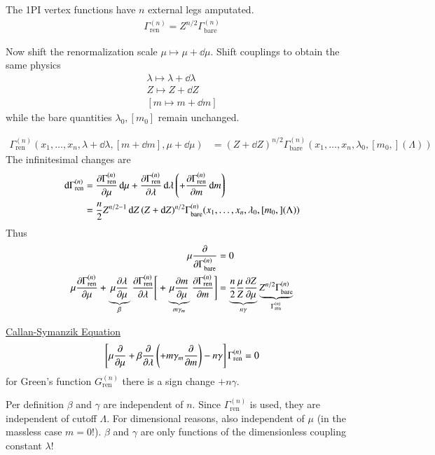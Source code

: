 The 1PI vertex functions have $n$ external legs amputated.
\begin{align}
   \Gamma_\text{ren}^{(n)} = Z^{n/2} \Gamma_\text{bare}^{(n)}
\end{align}

Now shift the renormalization scale $\mu \mapsto \mu + \dd{\mu}$. Shift couplings to obtain the same physics
\begin{align*}
   \lambda \mapsto \lambda + \dd{\lambda} \\
   Z \mapsto Z + \dd{Z} \\
   [m \mapsto m + \dd{m} ] 
\end{align*}
while the bare quantities $\lambda_0, [m_0] $ remain unchanged.

\begin{align}
   \Gamma_\text{ren}^{(n)}(x_1, \dots, x_n, \lambda + \dd{\lambda}, [m + \dd{m}], \mu + \dd{\mu}) &= (Z+ \dd{Z})^{n/2} \Gamma_\text{bare}^{(n)}(x_1,\dots, x_n, \lambda_0, [m_0,] (\Lambda))
\end{align}
The infinitesimal changes are
\begin{align*}
   \dd{\Gamma}_\text{ren}^{(n)} &= \pdv{\Gamma_\text{ren}^{(n)}}{\mu} \dd{\mu} + \pdv{\Gamma^{(n)}_\text{ren}}{\lambda} \dd{\lambda} \left( + \pdv{\Gamma_\text{ren}^{(n)}}{m} \dd{m} \right) \\
                                &= \frac{n}{2} Z^{n/2-1} \dd{Z} (Z+ \dd{Z})^{n/2} \Gamma_\text{bare}^{(n)}(x_1,\dots, x_n, \lambda_0, [m_0,] (\Lambda))
\end{align*}
Thus
\begin{align*}
   \mu \pdv{\Gamma_\text{bare}^{(n)}} &= 0 \\
   \mu \pdv{\Gamma_\text{ren}^{(n)}}{\mu} + \underbrace{ \mu \pdv{\lambda}{\mu}  }_{\beta} \pdv{\Gamma_\text{ren}^{(n)}}{\lambda} \Bigg[ + \underbrace{\mu \pdv{m}{\mu}}_{m \gamma_m} \pdv{\Gamma_\text{ren}^{(n)}}{m} \Bigg] &= \underbrace{\frac{n}{2} \frac{\mu}{Z} \pdv{Z}{\mu}}_{n \gamma} \underbrace{Z^{n/2} \Gamma_\text{bare}^{(n)}}_{\Gamma_\text{ren}^{(n)}}
\end{align*}

\underline{Callan-Symanzik Equation}
\begin{align}
   \left[ \mu \pdv{\mu} + \beta \pdv{\lambda} \left( + m \gamma_m \pdv{m} \right) - n \gamma \right] \Gamma_\text{ren}^{(n)} = 0
\end{align}
for Green's function $G_\text{ren}^{(n)}$ there is a sign change $+n\gamma$.

Per definition $\beta$ and $\gamma$ are independent of $n$. Since $\Gamma^{(n)}_\text{ren}$ is used, they are independent of cutoff $\Lambda$. For dimensional reasons, also independent of $\mu$ (in the massless case $m=0$!). $\beta$ and $\gamma$ are only functions of the dimensionless coupling constant $\lambda$! 

